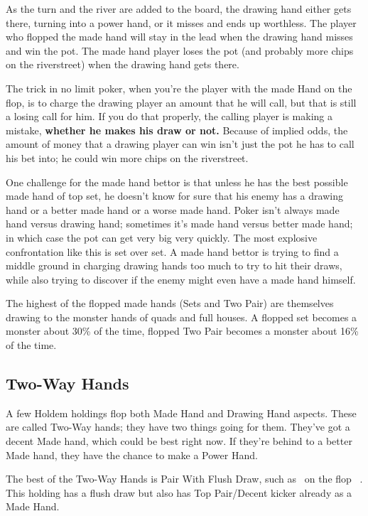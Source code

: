 
As the turn and the river are added to the board, the drawing hand
either gets there, turning into a power hand, or it misses and ends up
worthless. The player who flopped the made hand will stay in the lead
when the drawing hand misses and win the pot. The made hand player
loses the pot (and probably more chips on the riverstreet)
when the drawing hand gets there.

The trick in no limit poker, when you're the player with the made Hand
on the flop, is to charge the drawing player an amount that he will
call, but that is still a losing call for him. If
you do that properly, the calling player is making a mistake,
\textbf{whether he makes his draw or not.} Because of implied odds,
the amount of money that a drawing player can win isn't just the pot
he has to call his bet into; he could win more chips on the
riverstreet.

One challenge for the made hand bettor is that unless he has the best
possible made hand of top set, he doesn't know for sure that his
enemy has a drawing hand or a better made hand or a worse made
hand. Poker isn't always made hand versus drawing hand; sometimes it's
made hand versus better made hand; in which case the pot can get very
big very quickly. The most explosive confrontation like this is set
over set. A made hand bettor is trying to find a middle ground in
charging drawing hands too much to try to hit their draws, while also
trying to discover if the enemy might even have a made hand himself.

The highest of the flopped made hands (Sets and Two Pair) are themselves
drawing to the monster hands of quads and full houses. A flopped set
becomes a monster about 30\% of the time, flopped Two Pair becomes a
monster about 16\% of the time.

\subsection{Two-Way Hands}

A few Holdem holdings flop both Made Hand and Drawing Hand aspects.
These are called Two-Way hands; they have two things going for them.
They've got a decent Made hand, which could be best right now.
If they're behind to a better Made hand, they have the chance to make
a Power Hand.

The best of the Two-Way Hands is Pair With Flush Draw, such as
\Kd\tend\ on the flop \Kc\nined\eigd\ . This holding has a flush
draw but also has Top Pair/Decent kicker already as a Made Hand.

